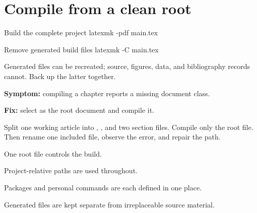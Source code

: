 \section{Compile from a clean root}

\begin{terminalcode}{Build the complete project}
latexmk -pdf main.tex
\end{terminalcode}

\begin{terminalcode}{Remove generated build files}
latexmk -C main.tex
\end{terminalcode}

Generated files can be recreated; source, figures, data, and bibliography
records cannot. Back up the latter together.

\begin{commonerror}
\textbf{Symptom:} compiling a chapter reports a missing document class.

\textbf{Fix:} select  as the root document and compile it.
\end{commonerror}

\begin{codelab}
Split one working article into , , and two
section files. Compile only the root file. Then rename one included file,
observe the error, and repair the path.
\end{codelab}

\begin{chapterchecklist}
  \item One root file controls the build.
  \item Project-relative paths are used throughout.
  \item Packages and personal commands are each defined in one place.
  \item Generated files are kept separate from irreplaceable source material.
\end{chapterchecklist}
